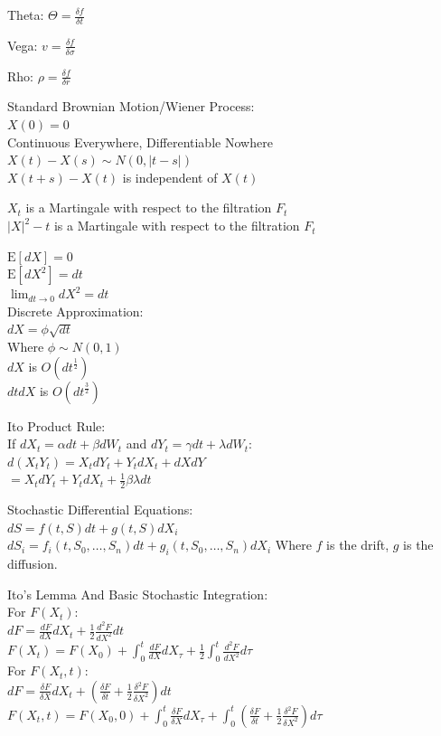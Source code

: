 Theta: $\Theta = \frac{\delta f}{\delta t}$

Vega: $v = \frac{\delta f}{\delta \sigma}$

Rho: $\rho = \frac{\delta f}{\delta r}$

Standard Brownian Motion/Wiener Process: \\
$X(0)=0$ \\
Continuous Everywhere, Differentiable Nowhere \\
$X(t)-X(s) \sim N(0,|t-s|)$ \\
$X(t+s)-X(t)$ is independent of $X(t)$

$X_t$ is a Martingale with respect to the filtration $F_t$ \\
$|X|^2-t$ is a Martingale with respect to the filtration $F_t$

$\text{E}[dX]=0$ \\
$\text{E}[dX^2]=dt$ \\
$\lim_{dt \to 0}dX^2=dt$ \\
Discrete Approximation: \\
$dX=\phi \sqrt{dt}$ \\
Where $\phi \sim N(0,1)$ \\
$dX$ is $O(dt^{\frac{1}{2}})$ \\
$dtdX$ is $O(dt^{\frac{3}{2}})$

Ito Product Rule: \\
If $dX_t=\alpha dt+\beta dW_t$ and $dY_t=\gamma dt + \lambda dW_t$: \\
$d(X_t Y_t)=X_t dY_t + Y_t dX_t + dXdY$ \\
$=X_t dY_t + Y_t dX_t + \frac{1}{2} \beta \lambda dt$

Stochastic Differential Equations: \\
$dS=f(t,S)dt+g(t,S)dX_i$ \\
$dS_i=f_i(t,S_0,\dots,S_n)dt+g_i(t,S_0,\dots,S_n)dX_i$
Where $f$ is the drift, $g$ is the diffusion.

Ito's Lemma And Basic Stochastic Integration: \\
For $F(X_t)$: \\
$dF = \frac{dF}{dX}dX_t + \frac{1}{2} \frac{d^2F}{dX^2}dt$ \\
$F(X_t)=F(X_0)+\int_{0}^{t} \frac{dF}{dX} dX_{\tau}+\frac{1}{2}\int_0^{t} \frac{d^2F}{dX^2} d\tau$ \\
For $F(X_t,t)$: \\
$dF=\frac{\delta F}{\delta X} dX_t + \left(\frac{\delta F}{\delta t}+\frac{1}{2} \frac{\delta^2 F}{\delta X^2} \right) dt$ \\
$F(X_t,t)=F(X_0,0)+\int_{0}^t \frac{\delta F}{\delta X}dX_{\tau} + \int_{0}^t \left( \frac{\delta F}{\delta t}+\frac{1}{2} \frac{\delta^2 F}{\delta X^2} \right) d\tau$


